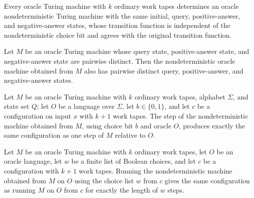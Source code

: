 \begin{definition}
\label{Turing.OracleTM.toOracleNDTM}
\leanok
{}
Every oracle Turing machine with $k$ ordinary work tapes determines an oracle
nondeterministic Turing machine with the same initial, query, positive-answer, and
negative-answer states, whose transition function is independent of the nondeterministic
choice bit and agrees with the original transition function.
\end{definition}

\begin{theorem}
\label{Turing.OracleTM.toOracleNDTM_wellFormed}
\leanok
{}
Let $M$ be an oracle Turing machine whose query state, positive-answer state, and
negative-answer state are pairwise distinct. Then the nondeterministic oracle machine
obtained from $M$ also has pairwise distinct query, positive-answer, and negative-answer
states.
\end{theorem}

\begin{theorem}
\label{Turing.toOracleNDTM_stepWith}
\leanok
{}
Let $M$ be an oracle Turing machine with $k$ ordinary work tapes, alphabet $\Sigma$, and
state set $Q$; let $O$ be a language over $\Sigma$, let $b\in\{0,1\}$, and let $c$ be a
configuration on input $x$ with $k+1$ work tapes. The step of the nondeterministic
machine obtained from $M$, using choice bit $b$ and oracle $O$, produces exactly the
same configuration as one step of $M$ relative to $O$.
\end{theorem}

\begin{theorem}
\label{Turing.OracleTM.toOracleNDTM_runWith}
\leanok
{}
Let $M$ be an oracle Turing machine with $k$ ordinary work tapes, let $O$ be an oracle
language, let $w$ be a finite list of Boolean choices, and let $c$ be a configuration
with $k+1$ work tapes. Running the nondeterministic machine obtained from $M$ on $O$
using the choice list $w$ from $c$ gives the same configuration as running $M$ on $O$
from $c$ for exactly the length of $w$ steps.
\end{theorem}

